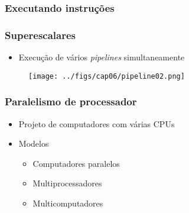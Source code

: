 \documentclass[aspectratio=169,
				xcolor=table]{beamer}
\begin{document}
	\begin{frame}
		\frametitle{Executando instruções}

		\begin{eftable}
		\end{eftable}
	\end{frame}
	
	\begin{frame}
		\frametitle{Superescalares}
		\begin{itemize}
			\item Execução de vários \textit{pipelines} simultaneamente

		\end{itemize}
		\begin{figure}
			\texttt{[image: ../figs/cap06/pipeline02.png]} 
		\end{figure}
	\end{frame}	

	\begin{frame}
		\frametitle{Paralelismo de processador}
		\begin{itemize}
			\item Projeto de computadores com várias CPUs
			\vspace{1em}
			\item Modelos
			\begin{itemize}
				\item Computadores paralelos
				\item Multiprocessadores
				\item Multicomputadores

			\end{itemize}

		\end{itemize}
	\end{frame}
	
\end{document}
